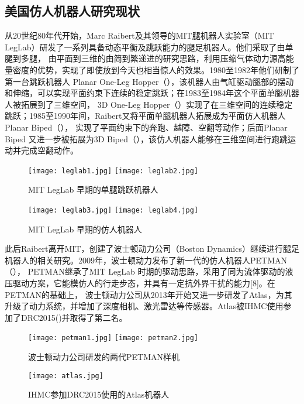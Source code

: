 \subsection{美国仿人机器人研究现状}
从20世纪80年代开始，Marc Raibert及其领导的MIT腿机器人实验室（MIT LegLab）研发了一系列具备动态平衡及跳跃能力的腿足机器人。他们采取了由单腿到多腿，
由平面到三维的由简到繁递进的研究思路，利用压缩气体动力源高能量密度的优势，实现了即使放到今天也相当惊人的效果。1980至1982年他们研制了第一台跳跃机器人
Planar One-Leg Hopper（），该机器人由气缸驱动腿部的摆动和伸缩，可以实现平面约束下连续的稳定跳跃；在1983至1984年这个平面单腿机器人被拓展到了三维空间，
3D One-Leg Hopper（）实现了在三维空间的连续稳定跳跃；1985至1990年间，Raibert又将平面单腿机器人拓展成为平面仿人机器人Planar Biped（），
实现了平面约束下的奔跑、越障、空翻等动作；后面Planar Biped 又进一步被拓展为3D Biped（），该仿人机器人能够在三维空间进行跑跳运动并完成空翻动作\cite{raibert1986legged}。
\begin{figure}[htbp]
    \centering
        {%
            \texttt{[image: leglab1.jpg]}}
        {%
            \texttt{[image: leglab2.jpg]}}
    \caption{MIT LegLab 早期的单腿跳跃机器人\label{fig:leglab}}
\end{figure}

\begin{figure}[htbp]
    \centering
        {%
            \texttt{[image: leglab3.jpg]}}
        {%
            \texttt{[image: leglab4.jpg]}}
    \caption{MIT LegLab 早期的仿人机器人\label{fig:leglab_biped}}
\end{figure}

此后Raibert离开MIT，创建了波士顿动力公司（Boston Dynamics）继续进行腿足机器人的相关研究。2009年，波士顿动力发布了新一代的仿人机器人PETMAN（），
PETMAN继承了MIT LegLab 时期的驱动思路，采用了同为流体驱动的液压驱动方案，它能模仿人的行走步态，并具有一定抗外界干扰的能力[8]。在PETMAN的基础上，
波士顿动力公司从2013年开始又进一步研发了Atlas，为其升级了动力系统，并增加了深度相机、激光雷达等传感器。Atlas被IHMC使用参加了DRC2015()并取得了第二名。
\begin{figure}[htbp]
    \centering
        {%
            \texttt{[image: petman1.jpg]}}
        {%
            \texttt{[image: petman2.jpg]}}
    \caption{波士顿动力公司研发的两代PETMAN样机\label{fig:leglab_biped}}
\end{figure}
\begin{figure}[htbp]
    \centering
    \texttt{[image: atlas.jpg]}
    \caption{\label{fig:atlas}IHMC参加DRC2015使用的Atlas机器人}
\end{figure}

